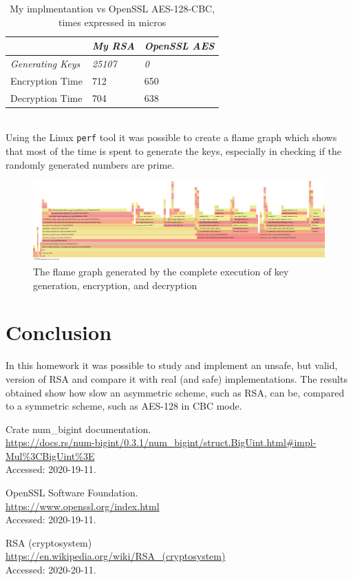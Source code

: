\documentclass[11pt]{article}
\begin{document}
\begin{table}[h!]
  \centering
  \begin{tabular}{|l|l|l|}
    \hline
    \textit{}                & \textit{My RSA} & \textit{OpenSSL AES} \\ \hline
    \textit{Generating Keys} & \textit{25107}  & \textit{0}           \\ \hline
    Encryption Time          & 712             & 650                  \\ \hline
    Decryption Time          & 704             & 638                  \\ \hline
  \end{tabular}
  \caption{My implmentantion vs OpenSSL AES-128-CBC, times expressed in micros}
\end{table}
\\
Using the Linux \Verb"perf" tool it was possible to create a flame graph which shows that most of the time is spent to
generate the keys, especially in checking if the randomly generated numbers are prime.\\
\begin{figure}[h]
  \includegraphics[scale=0.17]{flame.png}
  \caption{The flame graph generated by the complete execution of key generation, encryption, and decryption}
\end{figure}
\section{Conclusion}
In this homework it was possible to study and implement an unsafe, but valid,
version of RSA and compare it with real (and safe) implementations.
The results obtained show how slow an asymmetric scheme, such as RSA, can be, compared to a symmetric scheme, such as AES-128 in CBC mode.

\begin{thebibliography}{9}
  Crate num\_bigint documentation.\\
  \url{https://docs.rs/num-bigint/0.3.1/num_bigint/struct.BigUint.html#impl-Mul\%3CBigUint\%3E}
  \\Accessed: 2020-19-11.

  OpenSSL Software Foundation.\\
  \url{https://www.openssl.org/index.html}
  \\ Accessed: 2020-19-11.

  RSA (cryptosystem)\\
  \url{https://en.wikipedia.org/wiki/RSA_(cryptosystem)}
  \\Accessed: 2020-20-11.
\end{thebibliography}
\end{document}
